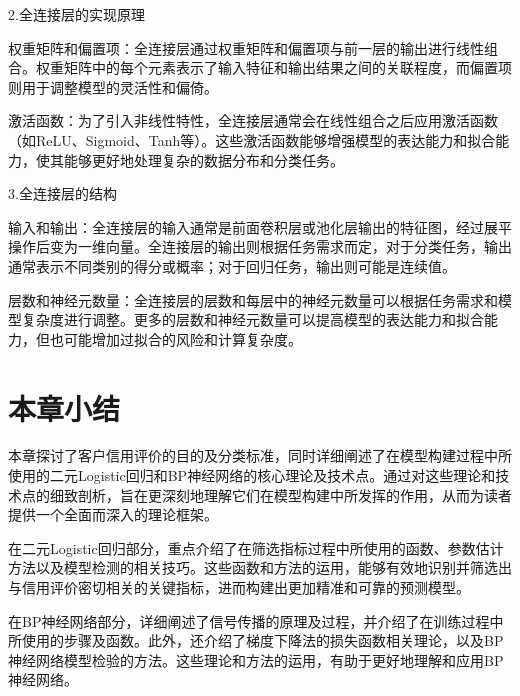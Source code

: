 2.全连接层的实现原理

权重矩阵和偏置项：全连接层通过权重矩阵和偏置项与前一层的输出进行线性组合。权重矩阵中的每个元素表示了输入特征和输出结果之间的关联程度，而偏置项则用于调整模型的灵活性和偏倚。

激活函数：为了引入非线性特性，全连接层通常会在线性组合之后应用激活函数（如ReLU、Sigmoid、Tanh等）。这些激活函数能够增强模型的表达能力和拟合能力，使其能够更好地处理复杂的数据分布和分类任务。

3.全连接层的结构

输入和输出：全连接层的输入通常是前面卷积层或池化层输出的特征图，经过展平操作后变为一维向量。全连接层的输出则根据任务需求而定，对于分类任务，输出通常表示不同类别的得分或概率；对于回归任务，输出则可能是连续值。

层数和神经元数量：全连接层的层数和每层中的神经元数量可以根据任务需求和模型复杂度进行调整。更多的层数和神经元数量可以提高模型的表达能力和拟合能力，但也可能增加过拟合的风险和计算复杂度。
\section{本章小结}

本章探讨了客户信用评价的目的及分类标准，同时详细阐述了在模型构建过程中所使用的二元Logistic回归和BP神经网络的核心理论及技术点。通过对这些理论和技术点的细致剖析，旨在更深刻地理解它们在模型构建中所发挥的作用，从而为读者提供一个全面而深入的理论框架。

在二元Logistic回归部分，重点介绍了在筛选指标过程中所使用的函数、参数估计方法以及模型检测的相关技巧。这些函数和方法的运用，能够有效地识别并筛选出与信用评价密切相关的关键指标，进而构建出更加精准和可靠的预测模型。

在BP神经网络部分，详细阐述了信号传播的原理及过程，并介绍了在训练过程中所使用的步骤及函数。此外，还介绍了梯度下降法的损失函数相关理论，以及BP神经网络模型检验的方法。这些理论和方法的运用，有助于更好地理解和应用BP神经网络。